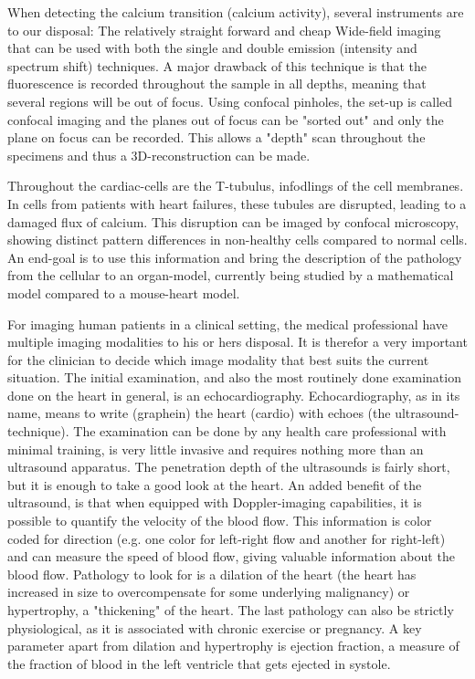 \documentclass[12p]{article}
\begin{document}
When detecting the calcium transition (calcium activity), several instruments are to our disposal: 
The relatively straight forward and cheap Wide-field imaging that can be used with both the single and double emission (intensity and spectrum shift) techniques. 
A major drawback of this technique is that the fluorescence is recorded throughout the sample in all depths, meaning that several regions will be out of focus.
Using confocal pinholes, the set-up is called confocal imaging and the planes out of focus can be "sorted out" and only the plane on focus can be recorded.
This allows a "depth" scan throughout the specimens and thus a 3D-reconstruction can be made.

Throughout the cardiac-cells are the T-tubulus, infodlings of the cell membranes.
In cells from patients with heart failures, these tubules are disrupted, leading to a damaged flux of calcium.
This disruption can be imaged by confocal microscopy, showing distinct pattern differences in non-healthy cells compared to normal cells.
An end-goal is to use this information and bring the description of the pathology from the cellular to an organ-model, currently being studied by a mathematical model compared to a mouse-heart model.

For imaging human patients in a clinical setting, the medical professional have multiple imaging modalities to his or hers disposal.
It is therefor a very important for the clinician to decide which image modality that best suits the current situation.
The initial examination, and also the most routinely done examination done on the heart in general, is an echocardiography.
Echocardiography, as in its name, means to write (graphein) the heart (cardio) with echoes (the ultrasound-technique).
The examination can be done by any health care professional with minimal training, is very little invasive and requires nothing more than an ultrasound apparatus.
The penetration depth of the ultrasounds is fairly short, but it is enough to take a good look at the heart.
An added benefit of the ultrasound, is that when equipped with Doppler-imaging capabilities, it is possible to quantify the velocity of the blood flow.
This information is color coded for direction (e.g. one color for left-right flow and another for right-left) and can measure the speed of blood flow, giving valuable information about the blood flow.
Pathology to look for is a dilation of the heart (the heart has increased in size to overcompensate for some underlying malignancy) or hypertrophy, a "thickening" of the heart.
The last pathology can also be strictly physiological, as it is associated with chronic exercise or pregnancy.
A key parameter apart from dilation and hypertrophy is ejection fraction, a measure of the fraction of blood in the left ventricle that gets ejected in systole.
\end{document}
